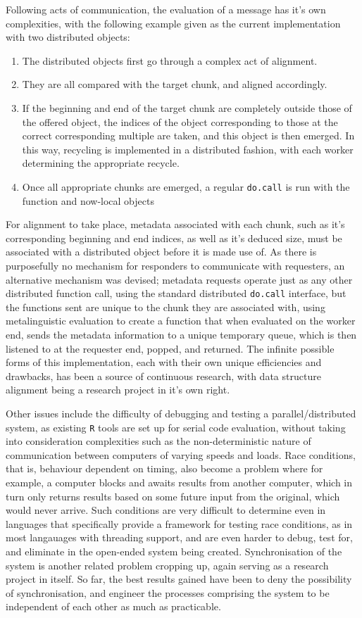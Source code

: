 Following acts of communication, the evaluation of a message has it's own complexities, with the following example given as the current implementation with two distributed objects:\\
\begin{enumerate}
	\item The distributed objects first go through a complex act of alignment.
	\item They are all compared with the target chunk, and aligned accordingly.
	\item If the beginning and end of the target chunk are completely outside those of the offered object, the indices of the object corresponding to those at the correct corresponding multiple are taken, and this object is then emerged.
		In this way, recycling is implemented in a distributed fashion, with each worker determining the appropriate recycle.
	\item Once all appropriate chunks are emerged, a regular \texttt{do.call} is run with the function and now-local objects
\end{enumerate}
For alignment to take place, metadata associated with each chunk, such as it's corresponding beginning and end indices, as well as it's deduced size, must be associated with a distributed object before it is made use of.
As there is purposefully no mechanism for responders to communicate with requesters, an alternative mechanism was devised; metadata requests operate just as any other distributed function call, using the standard distributed \texttt{do.call} interface, but the functions sent are unique to the chunk they are associated with, using metalinguistic evaluation to create a function that when evaluated on the worker end, sends the metadata information to a unique temporary queue, which is then listened to at the requester end, popped, and returned.
The infinite possible forms of this implementation, each with their own unique efficiencies and drawbacks, has been a source of continuous research, with data structure alignment being a research project in it's own right\cite{bryant2015computer}\cite{li1991data}.

Other issues include the difficulty of debugging and testing a parallel/distributed system, as existing \texttt{R} tools are set up for serial code evaluation, without taking into consideration complexities such as the non-deterministic nature of communication between computers of varying speeds and loads.
Race conditions, that is, behaviour dependent on timing, also become a problem where for example, a computer blocks and awaits results from another computer, which in turn only returns results based on some future input from the original, which would never arrive.
Such conditions are very difficult to determine even in languages that specifically provide a framework for testing race conditions, as in most langauages with threading support, and are even harder to debug, test for, and eliminate in the open-ended system being created\cite{serebryany2009threadsanitizer}.
Synchronisation of the system is another related problem cropping up, again serving as a research project in itself.
So far, the best results gained have been to deny the possibility of synchronisation, and engineer the processes comprising the system to be independent of each other as much as practicable.
